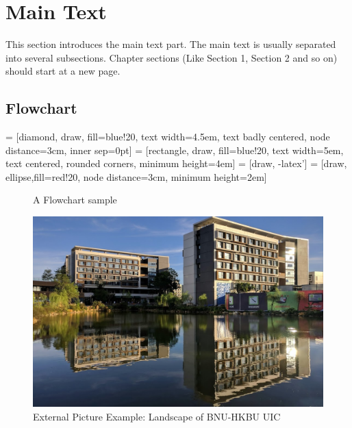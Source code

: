 \documentclass[12pt]{article}
\begin{document}
\section{Main Text}
This section introduces the main text part. The main text is usually separated into several subsections. Chapter sections (Like Section 1, Section 2 and so on) should start at a new page.
\subsection{Flowchart}
 = [diamond, draw, fill=blue!20, 
    text width=4.5em, text badly centered, node distance=3cm, inner sep=0pt]
 = [rectangle, draw, fill=blue!20, 
    text width=5em, text centered, rounded corners, minimum height=4em]
 = [draw, -latex']
 = [draw, ellipse,fill=red!20, node distance=3cm,
    minimum height=2em]
\begin{figure}[h]
    \centering
    \caption{A Flowchart sample}
    \label{flowchart_sample}
\end{figure}
\begin{figure}[H]
    \centering
    \includegraphics[scale=0.2]{assets/uic-landscape.png}
    \caption{External Picture Example: Landscape of BNU-HKBU UIC}
    \label{uic_landscape_picture}
\end{figure}
\end{document}
